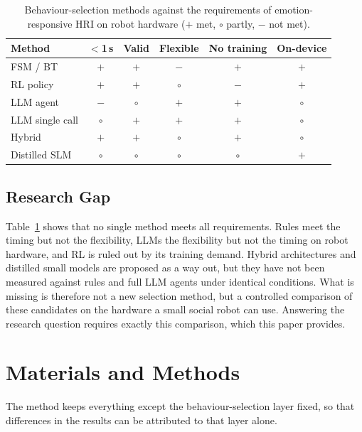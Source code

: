 \documentclass[conference]{IEEEtran}
\begin{document}
\begin{table}[t]
\caption{Behaviour-selection methods against the requirements of
emotion-responsive HRI on robot hardware ($+$ met, $\circ$ partly, $-$ not met).}
\label{tab:sota}
\centering
\setlength{\tabcolsep}{3pt}
\begin{tabular}{@{}lccccc@{}}
\toprule
Method & $<$1\,s & Valid & Flexible & No training & On-device \\
\midrule
FSM / BT \cite{Ghzouli2023BTSM}      & $+$ & $+$ & $-$ & $+$ & $+$ \\
RL policy \cite{Akalin2021RL}        & $+$ & $+$ & $\circ$ & $-$ & $+$ \\
LLM agent \cite{Yao2023ReAct}        & $-$ & $\circ$ & $+$ & $+$ & $\circ$ \\
LLM single call \cite{Willard2023Guided} & $\circ$ & $+$ & $+$ & $+$ & $\circ$ \\
Hybrid \cite{Umbrico2022Miriam}      & $+$ & $+$ & $\circ$ & $+$ & $\circ$ \\
Distilled SLM \cite{Hinton2015Distill} & $\circ$ & $\circ$ & $\circ$ & $\circ$ & $+$ \\
\bottomrule
\end{tabular}
\end{table}

\subsection{Research Gap}
Table~\ref{tab:sota} shows that no single method meets all requirements.
Rules meet the timing but not the flexibility, LLMs the flexibility but not
the timing on robot hardware, and RL is ruled out by its training demand.
Hybrid architectures and distilled small models are proposed as a way out,
but they have not been measured against rules and full LLM agents under
identical conditions. What is missing is therefore not a new selection
method, but a controlled comparison of these candidates on the hardware a
small social robot can use. Answering the research question requires
exactly this comparison, which this paper provides.

\section{Materials and Methods}

The method keeps everything except the behaviour-selection layer fixed, so
that differences in the results can be attributed to that layer alone.
\end{document}
